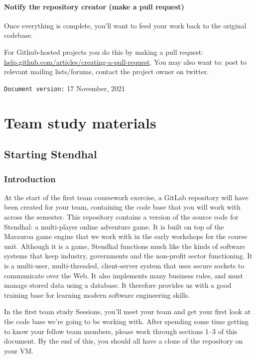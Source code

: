 \documentclass[
]{book}
\begin{document}
\hypertarget{pullrequest}{%
\subsection{Notify the repository creator (make a pull request)}\label{pullrequest}}

Once everything is complete, you'll want to feed your work back to the original codebase.

For Github-hosted projects you do this by making a pull request: \href{https://help.github.com/articles/creating-a-pull-request}{help.github.com/articles/creating-a-pull-request}. You may also want to: post to relevant mailing lists/forums, contact the project owner on twitter.

\texttt{Document\ version:} 17 November, 2021

\hypertarget{part-team-study-materials}{%
\part{Team study materials}\label{part-team-study-materials}}

\hypertarget{starting}{%
\chapter{Starting Stendhal}\label{starting}}

\hypertarget{introduction-2}{%
\section{Introduction}\label{introduction-2}}

At the start of the first team coursework exercise, a GitLab repository will have been created for your team, containing the code base that you will work with across the semester. This repository contains a version of the source code for Stendhal: a multi-player online adventure game. It is built on top of the Marauroa game engine that we work with in the early workshops for the course unit. Although it is a game, Stendhal functions much like the kinds of software systems that keep industry, governments and the non-profit sector functioning. It is a multi-user, multi-threaded, client-server system that uses secure sockets to communicate over the Web. It also implements many business rules, and must manage stored data using a database. It therefore provides us with a good training base for learning modern software engineering skills.

In the first team study Sessions, you'll meet your team and get your first look at the code base we're going to be working with. After spending some time getting to know your fellow team members, please work through sections 1--3 of this document. By the end of this, you should all have a clone of the repository on your VM.
\end{document}
